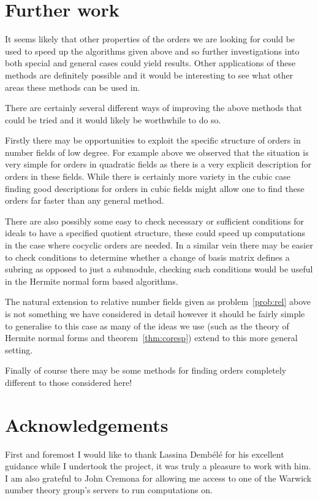 \documentclass[12pt,a4paper,abstracton,bibtotoc]{scrreprt}
\theoremstyle{definition}
\begin{document}

\section{Further work}
It seems likely that other properties of the orders we are looking for could be used to speed up the algorithms given above and so further investigations into both special and general cases could yield results.
Other applications of these methods are definitely possible and it would be interesting to see what other areas these methods can be used in.

There are certainly several different ways of improving the above methods that could be tried and it would likely be worthwhile to do so.

Firstly there may be opportunities to exploit the specific structure of orders in number fields of low degree.
For example above we observed that the situation is very simple for orders in quadratic fields as there is a very explicit description for orders in these fields.
While there is certainly more variety in the cubic case finding good descriptions for orders in cubic fields might allow one to find these orders far faster than any general method.

There are also possibly some easy to check necessary or sufficient conditions for ideals to have a specified quotient structure, these could speed up computations in the case where cocyclic orders are needed.
In a similar vein there may be easier to check conditions to determine whether a change of basis matrix defines a subring as opposed to just a submodule, checking such conditions would be useful in the Hermite normal form based algorithms.

The natural extension to relative number fields given as problem~\ref{prob:rel} above is not something we have considered in detail however it should be fairly simple to generalise to this case as many of the ideas we use (such as the theory of Hermite normal forms and theorem~\ref{thm:coresp}) extend to this more general setting.

Finally of course there may be some methods for finding orders completely different to those considered here!

\section{Acknowledgements}
First and foremost I would like to thank Lassina Demb\'el\'e for his excellent guidance while I undertook the project, it was truly a pleasure to work with him.
I am also grateful to John Cremona for allowing me access to one of the Warwick number theory group's servers to run computations on.
\end{document}
